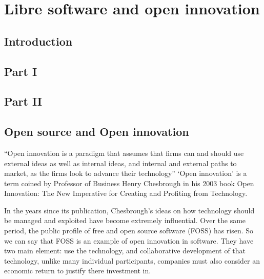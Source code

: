 \chapter{Libre software and open innovation}

\section{Introduction}

\section{Part I}\label{Part I}  %


\section{Part II}\label{Part II} %


 

\section* {Open source and Open innovation} \label{Open source and Open innovation}

“Open innovation is a paradigm that assumes that firms can and should use external ideas as well as internal ideas, and internal and external paths to market, as the firms look to advance their technology”
‘Open innovation’ is a term coined by Professor of Business Henry Chesbrough in his 2003 book Open Innovation: The New Imperative for Creating and Profiting from Technology. 

In the years since its publication, Chesbrough’s ideas on how technology should be managed and exploited have become extremely influential. Over the same period, the public profile of free and open source software (FOSS) has risen. 
So we can say that FOSS is an example of open innovation in software.
They have two main element: use the technology, and collaborative development of that technology, unlike many individual participants, companies must also consider an economic return to justify there investment in.


